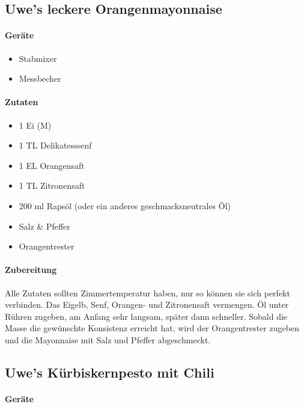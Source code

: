 \subsection{Uwe's leckere Orangenmayonnaise}\label{Orangenmayo}

\paragraph{Geräte}

\begin{itemize}[noitemsep]
	\item Stabmixer
	\item Messbecher
\end{itemize}

\paragraph{Zutaten}

\begin{itemize}[noitemsep]
	\item 1 Ei (M)
	\item 1 TL Delikatesssenf
	\item 1 EL Orangensaft
	\item 1 TL Zitronensaft
	\item 200 ml Rapsöl (oder ein anderes geschmacksneutrales Öl)
	\item Salz \& Pfeffer
	\item Orangentrester
\end{itemize}

\paragraph{Zubereitung}

Alle Zutaten sollten Zimmertemperatur haben, nur so können sie sich perfekt 
verbinden. Das Eigelb, Senf, Orangen- und Zitronensaft vermengen. Öl unter 
Rühren zugeben, am Anfang sehr langsam, später dann schneller. Sobald die 
Masse die gewünschte Konsistenz erreicht hat, wird der Orangentrester 
zugeben und die Mayonnaise mit Salz und Pfeffer abgeschmeckt.

\subsection{Uwe's Kürbiskernpesto mit Chili}

\paragraph{Geräte}

